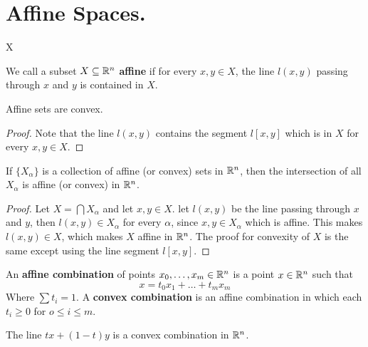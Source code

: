
\section{Affine Spaces.}

X\begin{definition}
    We call a subset $X \subseteq \mathbb{R}^n$  \textbf{affine} if for every $x,y \in
    X$, the line  $l(x,y)$ passing through $x$ and $y$ is contained in $X$.
\end{definition}

\begin{lemma}\label{3.1.1}
    Affine sets are convex.
\end{lemma}
\begin{proof}
    Note that the line $l(x,y)$ contains the segment $l[x,y]$ which is in $X$
    for every $x,y \in X$.
\end{proof}

\begin{theorem}\label{3.1.2}
    If $\{X_\alpha\}$ is a collection of affine (or convex) sets in $\mathbb{R}^n$,
    then the intersection of all $X_\alpha$ is affine (or convex) in $\mathbb{R}^n$.
\end{theorem}
\begin{proof}
    Let $X=\bigcap{X_\alpha}$ and let $x,y \in X$. let  $l(x,y)$ be the line
    passing through $x$ and $y$, then $l(x,y) \in X_\alpha$ for every $\alpha$,
    since  $x,y \in X_\alpha$  which is affine. This makes  $l(x,y) \in X$,
    which makes $X$ affine in  $\mathbb{R}^n$. The proof for convexity of  $X$ is the
    same except using the line segment  $l[x,y]$.
\end{proof}

\begin{definition}
    An \textbf{affine combination} of points $x_0, \dots,x_m \in \mathbb{R}^n$ is a
    point $x \in \mathbb{R}^n$ such that
    \begin{equation*}
        x=t_0x_1+\dots+t_mx_m
    \end{equation*}
    Where $\sum{t_i}=1$. A \textbf{convex combination} is an affine combination
    in which each $t_i \geq 0$ for $o \leq i \leq m$.
\end{definition}

\begin{example}\label{}
    The line $tx+(1-t)y$ is a convex combination in $\mathbb{R}^n$.
\end{example}

